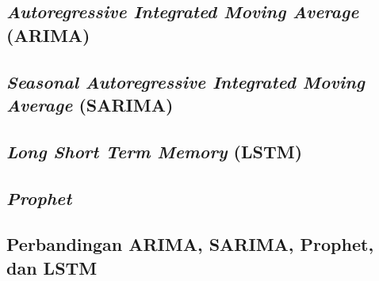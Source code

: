 \subsection{\textit{Autoregressive Integrated Moving Average} (ARIMA)}

\subsection{\textit{Seasonal Autoregressive Integrated Moving Average} (SARIMA)}

\subsection{\textit{Long Short Term Memory} (LSTM)}

\subsection{\textit{Prophet}}

\subsection{Perbandingan ARIMA, SARIMA, Prophet, dan LSTM}


